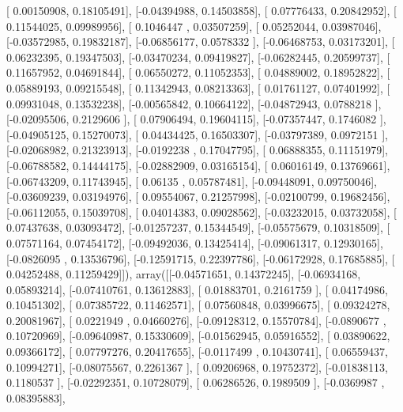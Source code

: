 \documentclass{article}
\begin{document}
       [ 0.00150908,  0.18105491],
       [-0.04394988,  0.14503858],
       [ 0.07776433,  0.20842952],
       [ 0.11544025,  0.09989956],
       [ 0.1046447 ,  0.03507259],
       [ 0.05252044,  0.03987046],
       [-0.03572985,  0.19832187],
       [-0.06856177,  0.0578332 ],
       [-0.06468753,  0.03173201],
       [ 0.06232395,  0.19347503],
       [-0.03470234,  0.09419827],
       [-0.06282445,  0.20599737],
       [ 0.11657952,  0.04691844],
       [ 0.06550272,  0.11052353],
       [ 0.04889002,  0.18952822],
       [ 0.05889193,  0.09215548],
       [ 0.11342943,  0.08213363],
       [ 0.01761127,  0.07401992],
       [ 0.09931048,  0.13532238],
       [-0.00565842,  0.10664122],
       [-0.04872943,  0.0788218 ],
       [-0.02095506,  0.2129606 ],
       [ 0.07906494,  0.19604115],
       [-0.07357447,  0.1746082 ],
       [-0.04905125,  0.15270073],
       [ 0.04434425,  0.16503307],
       [-0.03797389,  0.0972151 ],
       [-0.02068982,  0.21323913],
       [-0.0192238 ,  0.17047795],
       [ 0.06888355,  0.11151979],
       [-0.06788582,  0.14444175],
       [-0.02882909,  0.03165154],
       [ 0.06016149,  0.13769661],
       [-0.06743209,  0.11743945],
       [ 0.06135   ,  0.05787481],
       [-0.09448091,  0.09750046],
       [-0.03609239,  0.03194976],
       [ 0.09554067,  0.21257998],
       [-0.02100799,  0.19682456],
       [-0.06112055,  0.15039708],
       [ 0.04014383,  0.09028562],
       [-0.03232015,  0.03732058],
       [ 0.07437638,  0.03093472],
       [-0.01257237,  0.15344549],
       [-0.05575679,  0.10318509],
       [ 0.07571164,  0.07454172],
       [-0.09492036,  0.13425414],
       [-0.09061317,  0.12930165],
       [-0.0826095 ,  0.13536796],
       [-0.12591715,  0.22397786],
       [-0.06172928,  0.17685885],
       [ 0.04252488,  0.11259429]]), array([[-0.04571651,  0.14372245],
       [-0.06934168,  0.05893214],
       [-0.07410761,  0.13612883],
       [ 0.01883701,  0.2161759 ],
       [ 0.04174986,  0.10451302],
       [ 0.07385722,  0.11462571],
       [ 0.07560848,  0.03996675],
       [ 0.09324278,  0.20081967],
       [ 0.0221949 ,  0.04660276],
       [-0.09128312,  0.15570784],
       [-0.0890677 ,  0.10720969],
       [-0.09640987,  0.15330609],
       [-0.01562945,  0.05916552],
       [ 0.03890622,  0.09366172],
       [ 0.07797276,  0.20417655],
       [-0.0117499 ,  0.10430741],
       [ 0.06559437,  0.10994271],
       [-0.08075567,  0.2261367 ],
       [ 0.09206968,  0.19752372],
       [-0.01838113,  0.1180537 ],
       [-0.02292351,  0.10728079],
       [ 0.06286526,  0.1989509 ],
       [-0.0369987 ,  0.08395883],
\end{document}
